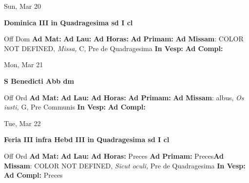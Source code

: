 \documentclass[10pt]{memoir}
\begin{document}
\begin{center}
\begin{minipage}{3.5in}
\vspace{2em}
\begin{center}Sun, Mar 20
\end{center}
\textbf{ \large Dominica III in Quadragesima
\textnormal{\normalsize sd I cl}}

\begin{justify}Off Dom
\textbf{Ad Mat: }
\textbf{Ad Lau: }
\textbf{Ad Horas: }
\textbf{Ad Primam: }\textbf{Ad Missam}: COLOR NOT DEFINED, \textit{Missa,} C, Pre de Quadragesima
\textbf{In Vesp: }
\textbf{Ad Compl: }
\end{justify}
\end{minipage}
\end{center}

\begin{center}
\begin{minipage}{3.5in}
\vspace{2em}
\begin{center}Mon, Mar 21
\end{center}
\textbf{ \large S Benedicti Abb
\textnormal{\normalsize dm}}

\begin{justify}Off Ord
\textbf{Ad Mat: }
\textbf{Ad Lau: }
\textbf{Ad Horas: }
\textbf{Ad Primam: }\textbf{Ad Missam}: albus, \textit{Os iusti,} G, Pre Communis
\textbf{In Vesp: }
\textbf{Ad Compl: }
\end{justify}
\end{minipage}
\end{center}

\begin{center}
\begin{minipage}{3.5in}
\vspace{2em}
\begin{center}Tue, Mar 22
\end{center}
\textbf{ \large Feria III infra Hebd III in Quadragesima
\textnormal{\normalsize sd I cl}}

\begin{justify}Off Ord
\textbf{Ad Mat: }
\textbf{Ad Lau: }
\textbf{Ad Horas: }Preces
\textbf{Ad Primam: }Preces\textbf{Ad Missam}: COLOR NOT DEFINED, \textit{Sicut oculi,} Pre de Quadragesima
\textbf{In Vesp: }
\textbf{Ad Compl: }Preces
\end{justify}
\end{minipage}
\end{center}
\end{document}
